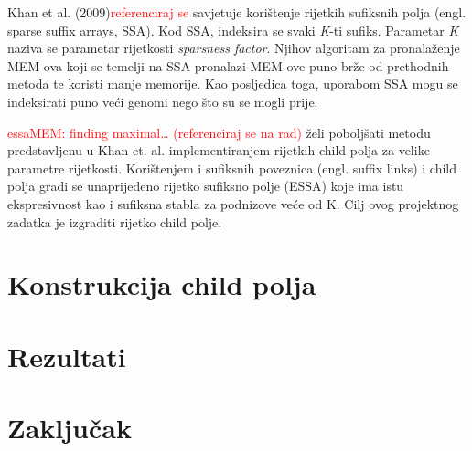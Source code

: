 \documentclass[times, utf8, seminar, numeric]{fer}
\newcommand\todo[1]{\textcolor{red}{#1}}
\begin{document}
Khan et al. (2009)\todo{referenciraj se} savjetuje korištenje rijetkih sufiksnih polja (engl. sparse suffix arrays, SSA). Kod SSA, indeksira se svaki \textit{K}-ti sufiks. Parametar \textit{K} naziva se parametar rijetkosti \textit{sparsness factor}. Njihov algoritam za pronalaženje MEM-ova koji se temelji na SSA pronalazi MEM-ove puno brže od prethodnih metoda te koristi manje memorije. Kao posljedica toga, uporabom SSA mogu se indeksirati puno veći genomi nego što su se mogli prije.

\todo{essaMEM: finding maximal… (referenciraj se na rad)} želi poboljšati metodu predstavljenu u Khan et. al. implementiranjem rijetkih child polja za velike parametre rijetkosti. Korištenjem i sufiksnih poveznica (engl. suffix links) i child polja gradi se unaprijeđeno rijetko sufiksno polje (ESSA) koje ima istu ekspresivnost kao i sufiksna stabla za podnizove veće od K. Cilj ovog projektnog zadatka je izgraditi rijetko child polje.

\chapter{Konstrukcija child polja}

\chapter{Rezultati}

\chapter{Zaključak}




\begin{sazetak}


\end{sazetak}
\end{document}
